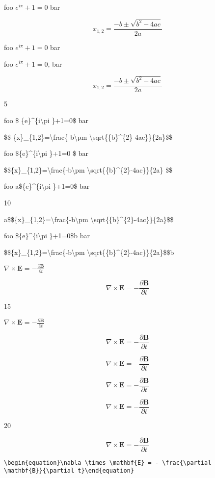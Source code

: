 foo \({e}^{i\pi }+1=0\) bar

\[ {x}_{1,2}=\frac{-b\pm \sqrt{{b}^{2}-4ac}}{2a} \]

foo ${e}^{i\pi }+1=0$ bar

foo ${e}^{i\pi }+1=0$, bar

$${x}_{1,2}=\frac{-b\pm \sqrt{{b}^{2}-4ac}}{2a}$$

5

foo \$ \{e\}\^{}\{i\textbackslash{}pi \}+1=0\$ bar

\$\$ \{x\}\_\{1,2\}=\textbackslash{}frac\{-b\textbackslash{}pm \textbackslash{}sqrt\{\{b\}\^{}\{2\}-4ac\}\}\{2a\}\$\$

foo \$\{e\}\^{}\{i\textbackslash{}pi \}+1=0 \$ bar

\$\$\{x\}\_\{1,2\}=\textbackslash{}frac\{-b\textbackslash{}pm \textbackslash{}sqrt\{\{b\}\^{}\{2\}-4ac\}\}\{2a\} \$\$

foo a\$\{e\}\^{}\{i\textbackslash{}pi \}+1=0\$ bar

10

a\$\$\{x\}\_\{1,2\}=\textbackslash{}frac\{-b\textbackslash{}pm \textbackslash{}sqrt\{\{b\}\^{}\{2\}-4ac\}\}\{2a\}\$\$

foo \$\{e\}\^{}\{i\textbackslash{}pi \}+1=0\$b bar

\$\$\{x\}\_\{1,2\}=\textbackslash{}frac\{-b\textbackslash{}pm \textbackslash{}sqrt\{\{b\}\^{}\{2\}-4ac\}\}\{2a\}\$\$b

$\nabla \times \mathbf{E} = - \frac{\partial \mathbf{B}}{\partial t}$

$$\nabla \times \mathbf{E} = - \frac{\partial \mathbf{B}}{\partial t}$$

15

\(\nabla \times \mathbf{E} = - \frac{\partial \mathbf{B}}{\partial t}\)

\[\nabla \times \mathbf{E} = - \frac{\partial \mathbf{B}}{\partial t}\]

\begin{equation}\nabla \times \mathbf{E} = - \frac{\partial \mathbf{B}}{\partial t}\end{equation}

\begin{equation}\nabla \times \mathbf{E} = - \frac{\partial \mathbf{B}}{\partial t}\end{equation}

\begin{equation}\nabla \times \mathbf{E} = - \frac{\partial \mathbf{B}}{\partial t}\end{equation}

20

\begin{equation}\nabla \times \mathbf{E} = - \frac{\partial \mathbf{B}}{\partial t}\end{equation}

\texttt{\textbackslash{}begin\{equation\}\textbackslash{}nabla \textbackslash{}times \textbackslash{}mathbf\{E\} = - \textbackslash{}frac\{\textbackslash{}partial \textbackslash{}mathbf\{B\}\}\{\textbackslash{}partial t\}\textbackslash{}end\{equation\}}

